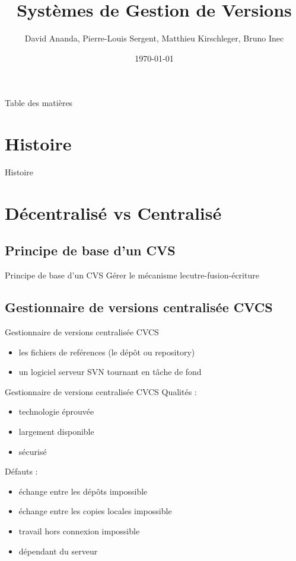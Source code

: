 \documentclass{beamer}
\title{Systèmes de Gestion de Versions}
\date{\today}
\author{David Ananda, Pierre-Louis Sergent, Matthieu Kirschleger, Bruno Inec}
\institute{IUT informatique Lyon1}
\begin{document}
  \maketitle

  \begin{frame}{Table des matières}
    \tableofcontents
  \end{frame}

  \section{Histoire}
  \begin{frame}{Histoire}
  \end{frame}

  \section{Décentralisé vs Centralisé}
  \subsection{Principe de base d'un CVS}
  \begin{frame}{Principe de base d'un CVS}
      Gérer le mécanisme lecutre-fusion-écriture
  \end{frame}

  \subsection{Gestionnaire de versions centralisée CVCS}
  \begin{frame}{Gestionnaire de versions centralisée CVCS}
    \begin{itemize}
      \item{les fichiers de reférences (le dépôt ou repository)}
      \item{un logiciel serveur SVN tournant en tâche de fond}
    \end{itemize}
  \end{frame}

  \begin{frame}{Gestionnaire de versions centralisée CVCS}
    Qualités :
    \begin{itemize}
      \item{technologie éprouvée}
      \item{largement disponible}
      \item{sécurisé}
    \end{itemize}

    Défauts :
    \begin{itemize}
      \item{échange entre les dépôts impossible}
      \item{échange entre les copies locales impossible}
      \item{travail hors connexion impossible}
      \item{dépendant du serveur}
    \end{itemize}
  \end{frame}
\end{document}
